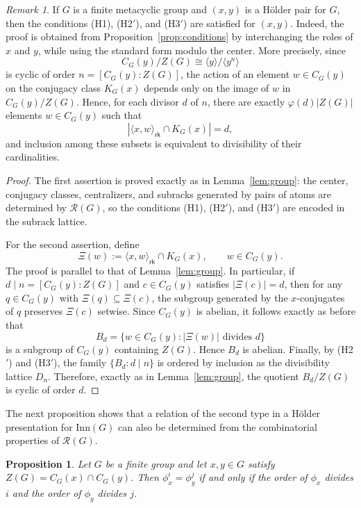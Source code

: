\documentclass[a4paper,12pt]{article}
\newtheorem{prop}[thm]{Proposition}
\theoremstyle{definition}
\theoremstyle{remark}
\newtheorem*{rem}{Remark}
\begin{document}
\begin{rem}
  If $G$ is a finite metacyclic group and $(x,y)$ is a Hölder pair for $G$, then the conditions (H1), (H2$'$), and (H3$'$) are satisfied for $(x,y)$. Indeed, the proof is obtained from Proposition~\ref{prop:conditions} by interchanging the roles of $x$ and $y$, while using the standard form modulo the center. More precisely, since
  $$ C_G(y)/Z(G)\cong \langle y\rangle/\langle y^n\rangle $$
  is cyclic of order $n=[C_G(y):Z(G)]$, the action of an element $w\in C_G(y)$ on the conjugacy class $K_G(x)$ depends only on the image of $w$ in $C_G(y)/Z(G)$. Hence, for each divisor $d$ of $n$, there are exactly $\varphi(d)|Z(G)|$ elements $w\in C_G(y)$ such that
  $$ |\langle x,w\rangle_{\mathsf{rk}}\cap K_G(x)|=d, $$
  and inclusion among these subsets is equivalent to divisibility of their cardinalities.
\end{rem}


\begin{proof}
  The first assertion is proved exactly as in Lemma~\ref{lem:group}: the center, conjugacy classes, centralizers, and subracks generated by pairs of atoms are determined by $\mathcal{R}(G)$, so the conditions (H1), (H2$'$), and (H3$'$) are encoded in the subrack lattice.

  For the second assertion, define
  $$ \Xi(w):=\langle x,w\rangle_{\mathsf{rk}}\cap K_G(x),\qquad w\in C_G(y). $$
  The proof is parallel to that of Lemma~\ref{lem:group}. In particular, if $d\mid n=[C_G(y):Z(G)]$ and $c\in C_G(y)$ satisfies $|\Xi(c)|=d$, then for any $q\in C_G(y)$ with $\Xi(q)\subseteq \Xi(c)$, the subgroup generated by the $x$-conjugates of $q$ preserves $\Xi(c)$ setwise. Since $C_G(y)$ is abelian, it follows exactly as before that
  $$ B_d=\{w\in C_G(y)\colon |\Xi(w)|\text{ divides }d\} $$
  is a subgroup of $C_G(y)$ containing $Z(G)$. Hence $B_d$ is abelian. Finally, by (H2$'$) and (H3$'$), the family $\{B_d\colon d\mid n\}$ is ordered by inclusion as the divisibility lattice $D_n$. Therefore, exactly as in Lemma~\ref{lem:group}, the quotient $B_d/Z(G)$ is cyclic of order $d$.
\end{proof}


The next proposition shows that a relation of the second type in a Hölder presentation for $\mathrm{Inn}(G)$ can also be determined from the combinatorial properties of $\mathcal R(G)$.

\begin{prop}\label{prop:second_relation}
  Let $G$ be a finite group and let $x,y\in G$ satisfy $Z(G)=C_G(x)\cap C_G(y)$. Then $\phi_x^i=\phi_y^j$ if and only if the order of $\phi_x$ divides $i$ and the order of $\phi_y$ divides $j$.
\end{prop}
\end{document}
